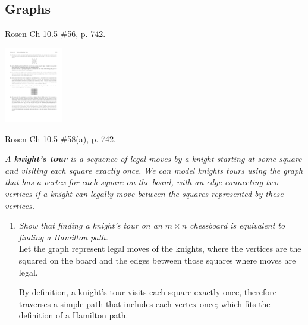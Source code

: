 \begin{questions}


\section*{Graphs}

 Rosen Ch 10.5 \#56, p. 742.
  \ifprintanswers
        \vspace{-10pt}
  \fi
  \begin{solution}
    \includegraphics[width=1in]{figs/rosen_10_5_56}
  \end{solution}


  \ifprintanswers
        \vspace{-10pt}
  \fi
{} Rosen Ch 10.5 \#58(a), p. 742.
  \ifprintanswers
        \vspace{-10pt}
  \fi
  \begin{solution}
  \textit{A \textbf{knight’s tour} is a sequence of legal moves by a knight starting at some square and visiting each square exactly once. We can model knights tours using the graph that has a vertex for each square on the board, with an edge connecting two vertices if a knight can legally move between the squares represented by these vertices.}

  \begin{enumerate}[label=(\alph*),itemsep=0pt,parsep=0pt,topsep=0pt,partopsep=0pt]
    \item \textit{Show that finding a knight’s tour on an $m \times n$ chessboard is equivalent to finding a Hamilton path.} \\
    Let the graph represent legal moves of the knights, where the vertices are the squared on the board and the edges between those squares where moves are legal. 

    By definition, a knight’s tour visits each square exactly once, therefore traverses a simple path that includes each vertex once; which fits the definition of a Hamilton path. 



\end{enumerate}
\end{solution}
\end{questions}
